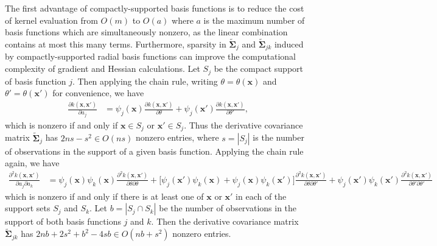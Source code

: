 \documentclass{article}
\numberwithin{equation}{section}
\newcommand{\cm}{\bm{\Sigma}}
\newcommand{\acm}{\widetilde{\cm}}
\begin{document}
The first advantage of compactly-supported basis functions is to reduce the cost of kernel evaluation from $O(m)$ to $O(a)$ where $a$ is the maximum number of basis functions which are simultaneously nonzero, as the linear combination contains at most this many terms. Furthermore, sparsity in $\acm_j$ and $\acm_{jk}$ induced by compactly-supported radial basis functions can improve the computational complexity of gradient and Hessian calculations. Let $S_j$ be the compact support of basis function $j$. Then applying the chain rule, writing $\theta = \theta(\bm{x})$ and $\theta' = \theta(\bm{x'})$ for convenience, we have
\begin{align*}
  \frac{\partial k(\bm{x}, \bm{x'})}{\partial a_j}
  & = \psi_j(\bm{x}) \frac{\partial k(\bm{x}, \bm{x'})}{\partial \theta} + \psi_j(\bm{x'}) \frac{\partial k(\bm{x}, \bm{x'})}{\partial \theta'},
\end{align*}
which is nonzero if and only if $\bm{x} \in S_j$ or $\bm{x'} \in S_j$. Thus the derivative covariance matrix $\acm_j$ has $2ns -s^2 \in O(ns)$ nonzero entries, where $s = |S_j|$ is the number of observations in the support of a given basis function. Applying the chain rule again, we have
\begin{align*}
  \frac{\partial^2 k(\bm{x}, \bm{x'})}{\partial a_j \partial a_k}
  & = \psi_j(\bm{x}) \psi_k(\bm{x}) \frac{\partial^2 k(\bm{x}, \bm{x'})}{\partial \theta \partial \theta}
  + \Big[\psi_j(\bm{x'}) \psi_k(\bm{x}) + \psi_j(\bm{x}) \psi_k(\bm{x'})\Big]
  \frac{\partial^2 k(\bm{x}, \bm{x'})}{\partial \theta \partial \theta'}
  + \psi_j(\bm{x'}) \psi_k(\bm{x'}) \frac{\partial^2 k(\bm{x}, \bm{x'})}{\partial \theta' \partial \theta'}
\end{align*}
which is nonzero if and only if there is at least one of $\bm{x}$ or $\bm{x'}$ in each of the support sets $S_j$ and $S_k$. Let $b = |S_j \cap S_k|$ be the number of observations in the support of both basis functions $j$ and $k$. Then the derivative covariance matrix $\acm_{jk}$ has $2nb + 2s^2 + b^2 - 4sb \in O(nb + s^2)$ nonzero entries.
\end{document}
